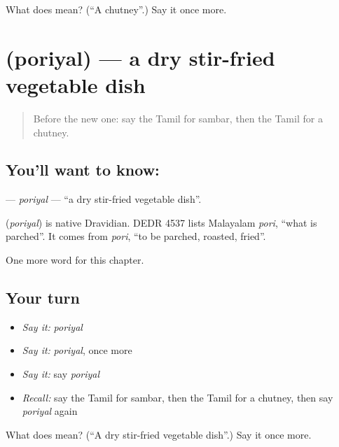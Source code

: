 \begin{tcolorbox}[breakable,colback=teal!4,colframe=teal!35!black,title={Before you move on}]
What does  mean? (\textquotedblleft{}A chutney\textquotedblright{}.) Say it once more.
\end{tcolorbox}
\section[\texorpdfstring{\ta{பொரியல்} (poriyal)}{பொரியல் (poriyal)}]{ (poriyal) — a dry stir-fried vegetable dish}

\label{lesson:TA-C183-poriyal}



\begin{quote}
Before the new one: say the Tamil for sambar, then the Tamil for a chutney.
\end{quote}

\subsection*{You'll want to know: }
\textbf{} — \emph{poriyal} — \textquotedblleft{}a dry stir-fried vegetable dish\textquotedblright{}.

\begin{cousinweb}
\textbf{} (\emph{poriyal}) is native Dravidian. DEDR 4537 lists Malayalam \emph{pori}, \textquotedblleft{}what is parched\textquotedblright{}. It comes from \emph{pori}, \textquotedblleft{}to be parched, roasted, fried\textquotedblright{}.
\end{cousinweb}

\begin{grammarlens}[title={What you've built}]
One more word for this chapter.
\end{grammarlens}

\subsection*{Your turn}
\begin{itemize}
\raggedright
  \item \emph{Say it:} \emph{poriyal}
  \item \emph{Say it:} \emph{poriyal}, once more
  \item \emph{Say it:} say \emph{poriyal}
  \item \emph{Recall:} say the Tamil for sambar, then the Tamil for a chutney, then say \emph{poriyal} again
\end{itemize}

\begin{tcolorbox}[breakable,colback=teal!4,colframe=teal!35!black,title={Before you move on}]
What does  mean? (\textquotedblleft{}A dry stir-fried vegetable dish\textquotedblright{}.) Say it once more.
\end{tcolorbox}
